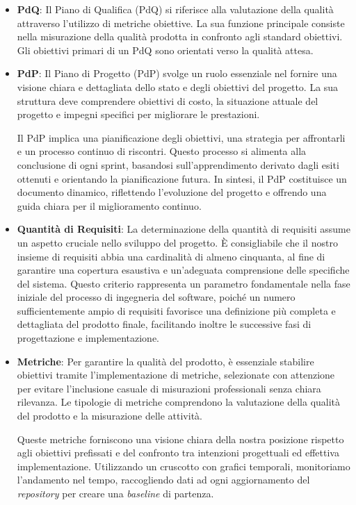 \begin{itemize}
	\item 	\textbf{PdQ}:
			Il Piano di Qualifica (PdQ) si riferisce alla valutazione della qualità attraverso 
			l'utilizzo di metriche obiettive. 
			La sua funzione principale consiste nella misurazione della qualità prodotta in confronto 
			agli standard obiettivi. 
			Gli obiettivi primari di un PdQ sono orientati verso la qualità attesa.


	\item 	\textbf{PdP}:
			Il Piano di Progetto (PdP) svolge un ruolo essenziale nel fornire una visione chiara e dettagliata 
			dello stato e degli obiettivi del progetto. 
			La sua struttura deve comprendere obiettivi di costo, la situazione attuale del progetto e impegni 
			specifici per migliorare le prestazioni.

			Il PdP implica una pianificazione degli obiettivi, una strategia per affrontarli e un processo continuo di riscontri. 
			Questo processo si alimenta alla conclusione di ogni sprint, basandosi sull'apprendimento derivato 
			dagli esiti ottenuti e orientando la pianificazione futura. 
			In sintesi, il PdP costituisce un documento dinamico, riflettendo l'evoluzione del progetto e 
			offrendo una guida chiara per il miglioramento continuo.

	\item 	\textbf{Quantità di Requisiti}:	
			La determinazione della quantità di requisiti assume un aspetto cruciale nello sviluppo del progetto. 
			È consigliabile che il nostro insieme di requisiti abbia una cardinalità di almeno cinquanta, 
			al fine di garantire una copertura esaustiva e un'adeguata comprensione delle specifiche del sistema. 
			Questo criterio rappresenta un parametro fondamentale nella fase iniziale del processo di ingegneria del software, 
			poiché un numero sufficientemente ampio di requisiti favorisce una definizione più completa e dettagliata del prodotto finale, 
			facilitando inoltre le successive fasi di progettazione e implementazione.

	\item 	\textbf{Metriche}:		
			Per garantire la qualità del prodotto, è essenziale stabilire obiettivi tramite l'implementazione di metriche, 
			selezionate con attenzione per evitare l'inclusione casuale di misurazioni professionali senza chiara rilevanza. 
			Le tipologie di metriche comprendono la valutazione della qualità del prodotto e la misurazione delle attività.
			
			Queste metriche forniscono una visione chiara della nostra posizione rispetto agli obiettivi prefissati e del 
			confronto tra intenzioni progettuali ed effettiva implementazione. 
			Utilizzando un cruscotto con grafici temporali, monitoriamo l'andamento nel tempo, raccogliendo dati ad ogni 
			aggiornamento del \textit{repository} per creare una \textit{baseline} di partenza.



\end{itemize}
